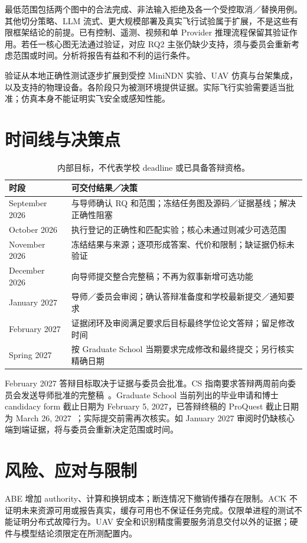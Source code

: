 最低范围包括两个图中的合法完成、非法输入拒绝及各一个受控取消／替换用例。其他切分策略、LLM 流式、更大规模部署及真实飞行试验属于扩展，不是这些有限框架结论的前提。已有控制、遥测、视频和单 Provider 推理流程保留其验证作用。若任一核心图无法通过验证，对应 RQ2 主张仍缺少支持，须与委员会重新考虑范围或时间。分析将报告有益和不利的运行条件。

验证从本地正确性测试逐步扩展到受控 MiniNDN 实验、UAV 仿真与台架集成，以及支持的物理设备。各阶段只为被测环境提供证据。实际飞行实验需要适当批准；仿真本身不能证明实飞安全或感知性能。


\section{时间线与决策点}
\begin{table}[H]\centering\small
\caption{内部目标，不代表学校 deadline 或已具备答辩资格。}
\begin{tabularx}{\textwidth}{p{}X}
\toprule 时段 & 可交付结果／决策\\\midrule
September 2026 & 与导师确认 RQ 和范围；冻结任务图及源码／证据基线；解决正确性阻塞\\\midrule
October 2026 & 执行登记的正确性和匹配实验；核心未通过则减少可选范围\\\midrule
November 2026 & 冻结结果与来源；逐项形成答案、代价和限制；缺证据仍标未验证\\\midrule
December 2026 & 向导师提交整合完整稿；不再为叙事新增可选功能\\\midrule
January 2027 & 导师／委员会审阅；确认答辩准备度和学校最新提交／通知要求\\\midrule
February 2027 & 证据闭环及审阅满足要求后目标最终学位论文答辩；留足修改时间\\\midrule
Spring 2027 & 按 Graduate School 当期要求完成修改和最终提交；另行核实精确日期\\\bottomrule
\end{tabularx}\end{table}

February 2027 答辩目标取决于证据与委员会批准。CS 指南要求答辩两周前向委员会发送导师批准的完整稿~\cite{memphiscsdefense}。Graduate School 当前列出的毕业申请和博士 candidacy form 截止日期为 February 5, 2027，已答辩终稿的 ProQuest 截止日期为 March 26, 2027~\cite{memphisgraduation}；实际提交前需再次核实。如 January 2027 审阅时仍缺核心端到端证据，将与委员会重新决定范围或时间。

\section{风险、应对与限制}
ABE 增加 authority、计算和换钥成本；断连情况下撤销传播存在限制。ACK 不证明未来资源可用或报告真实，缓存可用也不保证任务完成。仅限单进程的测试不能证明分布式故障行为。UAV 安全和识别精度需要服务消息交付以外的证据；硬件与模型结论须限定在所测配置内。


